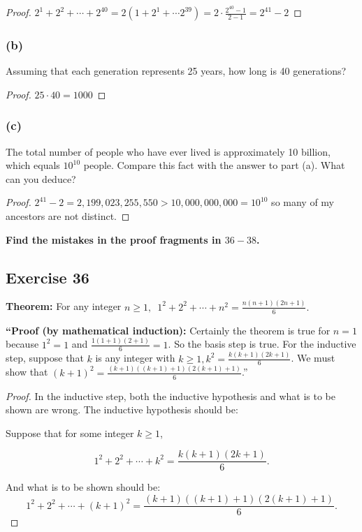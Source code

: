 \documentclass[14pt]{extarticle}
\newcommand{\dps}{\displaystyle}
\newcommand{\cy}{\color{cyan}}
\begin{document}
\begin{proof}
$\dps 2^1 + 2^2 + \cdots + 2^{40} = 2(1 + 2^1 + \cdots 2^{39}) = 2 \cdot \frac{2^{40} - 1}{2 - 1} = 2^{41} - 2$
\end{proof}

\subsubsection{(b)}
Assuming that each generation represents 25 years, how long is 40 generations?

\begin{proof}
$25 \cdot 40 = 1000$
\end{proof}

\subsubsection{(c)}
The total number of people who have ever lived is approximately 10 billion, which equals $10^{10}$ people. Compare this fact with the answer to part (a). What can you deduce?

\begin{proof}
$2^{41} - 2 = 2,199,023,255,550 > 10,000,000,000 = 10^{10}$ so many of my ancestors are not distinct.
\end{proof}

{\bf \cy Find the mistakes in the proof fragments in $36-38$.}

\subsection{Exercise 36}
{\bf Theorem:} For any integer $\dps n \geq 1, \,\,\, 1^2 + 2^2 + \cdots + n^2 = \frac{n(n+1)(2n+1)}{6}.$

{\bf ``Proof (by mathematical induction):} Certainly the theorem is true for $n = 1$ because $1^2 = 1$ and $\dps \frac{1(1+1)(2+1)}{6} = 1$. So the basis step is true. For the inductive step, suppose that $k$ is any integer with $\dps k \geq 1, k^2 = \frac{k(k+1)(2k+1)}{6}$. We must show that $\dps (k+1)^2 = \frac{(k+1)((k+1)+1)(2(k+1)+1)}{6}$.''

\begin{proof}
In the inductive step, both the inductive hypothesis and what is to be shown are wrong. The inductive hypothesis should be: 

Suppose that for some integer $k \geq 1$, 

\[
\dps 1^2 + 2^2 + \cdots + k^2 = \frac{k(k+1)(2k+1)}{6}.
\]

And what is to be shown should be:
\[
\dps 1^2 + 2^2 + \cdots + (k + 1)^2 = \frac{(k + 1)((k + 1) + 1)(2(k+1)+1)}{6}.
\]
\end{proof}
\end{document}
